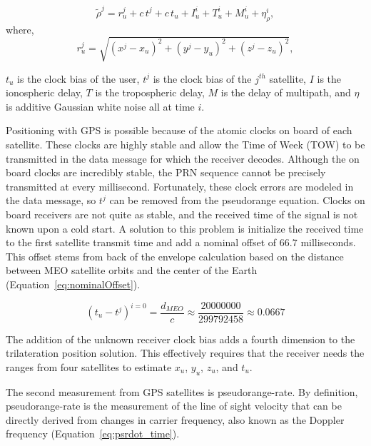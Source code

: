 \begin{equation}\label{eq:psr_meters}
    \tilde{\rho}^j = r_u^j + c\,t^j + c\,t_u + I^i_u + T^i_u+ M^i_u + \eta^i_{\rho},
\end{equation}
where,
\begin{equation}\label{eq:range_meters}
    r^j_u = \sqrt{{\left(x^j - x_u\right)}^2 + {\left(y^j - y_u\right)}^2 + {\left(z^j - z_u\right)}^2},
\end{equation}

\(t_u\) is the clock bias of the user, \(t^j\) is the clock bias of the \(j^{th}\) satellite, \(I\) is the ionospheric delay, \(T\) is the tropospheric delay, \(M\) is the delay of multipath, and \(\eta \) is additive Gaussian white noise all at time \(i\).

Positioning with GPS is possible because of the atomic clocks on board of each satellite. These clocks are highly stable and allow the Time of Week (TOW) to be transmitted in the data message for which the receiver decodes. Although the on board clocks are incredibly stable, the PRN sequence cannot be precisely transmitted at every millisecond. Fortunately, these clock errors are modeled in the data message, so \(t^j\) can be removed from the pseudorange equation. Clocks on board receivers are not quite as stable, and the received time of the signal is not known upon a cold start. A solution to this problem is initialize the received time to the first satellite transmit time and add a nominal offset of \(66.7\) milliseconds. This offset stems from back of the envelope calculation based on the distance between MEO satellite orbits and the center of the Earth (Equation~\ref{eq:nominalOffset}).

\begin{equation}\label{eq:nominalOffset}
    {\left(t_u - t^{j} \right)}^{i = 0} = \frac{d_{MEO}}{c} \approx \frac{20000000}{299792458} \approx 0.0667
\end{equation}

The addition of the unknown receiver clock bias adds a fourth dimension to the trilateration position solution. This effectively requires that the receiver needs the ranges from four satellites to estimate \(x_u\), \(y_u\), \(z_u\), and \(t_u\).

The second measurement from GPS satellites is pseudorange-rate. By definition, pseudorange-rate is the measurement of the line of sight velocity that can be directly derived from changes in carrier frequency, also known as the Doppler frequency (Equation~\ref{eq:psrdot_time}).

